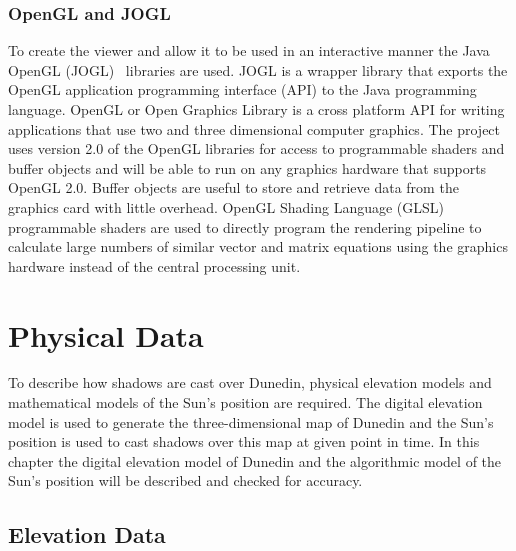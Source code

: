 \documentclass[12pt]{report}
\begin{document}
\subsection{OpenGL and JOGL} 
To create the viewer and allow it to be used in an interactive manner the Java OpenGL (JOGL)~\cite{JOGL} libraries are used. JOGL is a wrapper library that exports the OpenGL application programming interface (API) to the Java programming language. OpenGL or Open Graphics Library is a cross platform API for writing applications that use two and three dimensional computer graphics. The project uses version 2.0 of the OpenGL libraries for access to programmable shaders and buffer objects and will be able to run on any graphics hardware that supports OpenGL 2.0. Buffer objects are useful to store and retrieve data from the graphics card with little overhead.
OpenGL Shading Language (GLSL) programmable shaders are used to directly program the rendering pipeline to calculate large numbers of similar vector and matrix equations using the graphics hardware instead of the central processing unit.


\chapter{Physical Data}
To describe how shadows are cast over Dunedin, physical elevation models and mathematical models of the Sun's position are required. The digital elevation model is used to generate the three-dimensional map of Dunedin and the Sun's position is used to cast shadows over this map at given point in time. In this chapter the digital elevation model of Dunedin and the algorithmic model of the Sun's position will be described and checked for accuracy.

\section{Elevation Data}
\end{document}
